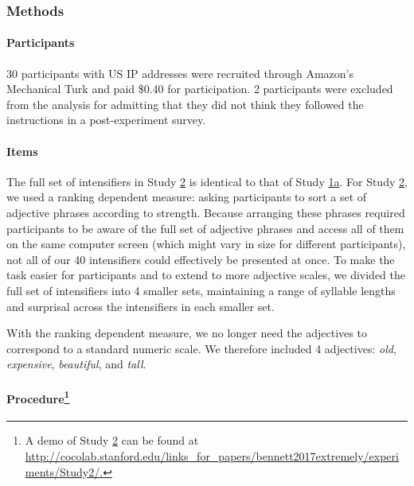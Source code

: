 \documentclass[10pt,letterpaper]{article}
\newcommand{\w}[1]{\emph{#1}}
\begin{document}
\subsubsection{Methods}

\paragraph{Participants}

30 participants with US IP addresses were recruited through Amazon's Mechanical Turk and paid \$0.40 for  participation. 2 participants were excluded from the analysis for admitting that they did not think they followed the instructions in a post-experiment survey.

\paragraph{Items}

The full set of intensifiers in Study \hyperref[sec:study2]{2} is identical to that of Study \hyperref[sec:study1a]{1a}. 
For Study \hyperref[sec:study2]{2}, we used a ranking dependent measure: asking participants to sort a set of adjective phrases according to strength.
Because arranging these phrases required participants to be aware of the full set of adjective phrases and access all of them on the same computer screen (which might vary in size for different participants), not all of our 40 intensifiers could effectively be presented at once.
To make the task easier for participants and to extend to more adjective scales, we divided the full set of intensifiers into 4 smaller sets, maintaining a range of syllable lengths and surprisal across the intensifiers in each smaller set.

With the ranking dependent measure, we no longer need the adjectives to correspond to a standard numeric scale.
We therefore included 4 adjectives: \w{old}, \w{expensive}, \w{beautiful}, and \w{tall}.

\paragraph{Procedure\footnote{A demo of Study \hyperref[sec:study2]{2} can be found at \url{http://cocolab.stanford.edu/links_for_papers/bennett2017extremely/experiments/Study2/.}}}
\end{document}
